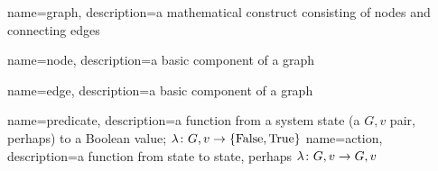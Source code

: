 
{
  name=graph,
  description={a mathematical construct consisting of nodes and connecting edges}
}

{
  name=node,
  description={a basic component of a graph}
}

{
  name=edge,
  description={a basic component of a graph}
}

{
  name=predicate,
  description={a function from a system state (a $G, v$ pair, perhaps) to a Boolean value; $\Function{G, v}{\Set{\text{False}, \text{True}}}$}
}
{
  name=action,
  description={a function from state to state, perhaps $\Function{G, v}{G, v}$}
}

